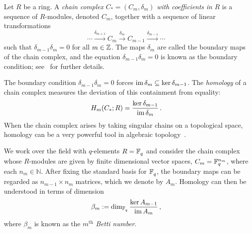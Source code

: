 Let $R$ be a ring. A {\em chain complex $C_*=(C_m, \delta_m)$ with coefficients in
$R$} is a sequence of $R$-modules, denoted $C_m$, together with a sequence of
linear transformations 
\[
  \cdots \xrightarrow{\delta_{m+1}} C_m \xrightarrow{\delta_m}
  C_{m-1} \xrightarrow{\delta_{m-1}} \cdots
\]
such that $\delta_{m-1}\delta_m = 0$ for all $m \in \mathbb{Z}$.  The maps $\delta_m$
are called the boundary maps of the chain complex, and the equation
$\delta_{m-1} \delta_m = 0$ is known as the boundary condition;
see~\cite{cartan2016homological} for further details. 

The boundary condition $\delta_{m-1}\delta_m=0$ forces $\operatorname{\mathrm{im}} \delta_m \subseteq \ker \delta_{m-1}$.
The {\em homology} of a chain complex measures the deviation of this containment
from equality:
\begin{equation*}
  \label{eqn:hom}
  H_m(C_*;R) = \frac{\ker \delta_{m-1}}{\operatorname{\mathrm{im}} \delta_m} \, .
\end{equation*}
When the chain complex arises by taking singular chains on a topological
space, homology can be a very powerful tool in algebraic topology~\cite{hatcher2002algebraic}. 


We work over the field with $q$-elements $R = \mathbb{F}_q^{}$ and consider the chain
complex whose $R$-modules are given by finite dimensional vector spaces,  $C_m
= \mathbb{F}_q^{n_m}$, where each $n_m \in \mathbb{N}$. After fixing the standard
basis for $\mathbb{F}_q^{}$, the boundary
maps can be regarded as $n_{m-1}\times n_m $ matrices, which we denote by
$A_m$. Homology can then be understood in terms of dimension
\begin{equation*}
  \beta_m := \dim_{\mathbb{F}_q^{}} \frac{\ker A_{m-1}}{\operatorname{\mathrm{im}} A_m} \, ,
  \label{eqn:betti_numbers}
\end{equation*}
where $\beta_m$ is known as the $m^\mathrm{th}$ {\em Betti number}.

%

